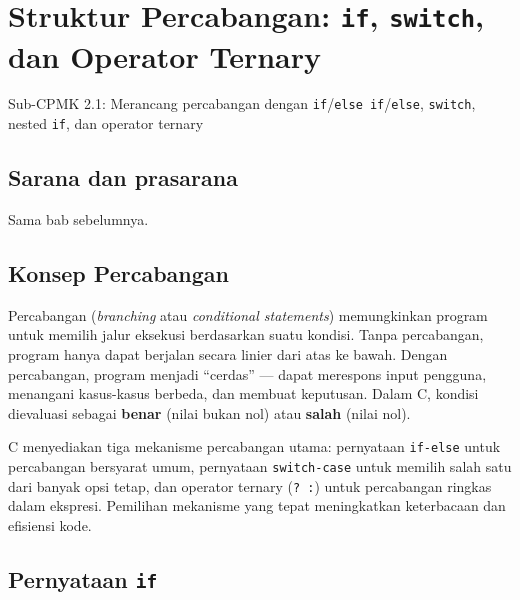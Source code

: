 \documentclass[../main.tex]{subfiles}
\begin{document}
\chapter{Struktur Percabangan: \texttt{if}, \texttt{switch}, dan Operator Ternary}

\begin{subcpmk}
  \item Sub-CPMK 2.1: Merancang percabangan dengan \texttt{if}/\texttt{else if}/\texttt{else}, \texttt{switch}, nested \texttt{if}, dan operator ternary
\end{subcpmk}


\section{Sarana dan prasarana}
Sama bab sebelumnya.

\section{Konsep Percabangan}

Percabangan (\textit{branching} atau \textit{conditional statements}) memungkinkan program untuk memilih jalur eksekusi berdasarkan suatu kondisi. Tanpa percabangan, program hanya dapat berjalan secara linier dari atas ke bawah. Dengan percabangan, program menjadi ``cerdas'' --- dapat merespons input pengguna, menangani kasus-kasus berbeda, dan membuat keputusan. Dalam C, kondisi dievaluasi sebagai \textbf{benar} (nilai bukan nol) atau \textbf{salah} (nilai nol).

C menyediakan tiga mekanisme percabangan utama: pernyataan \texttt{if-else} untuk percabangan bersyarat umum, pernyataan \texttt{switch-case} untuk memilih salah satu dari banyak opsi tetap, dan operator ternary (\texttt{? :}) untuk percabangan ringkas dalam ekspresi. Pemilihan mekanisme yang tepat meningkatkan keterbacaan dan efisiensi kode.

\section{Pernyataan \texttt{if}}
\end{document}
